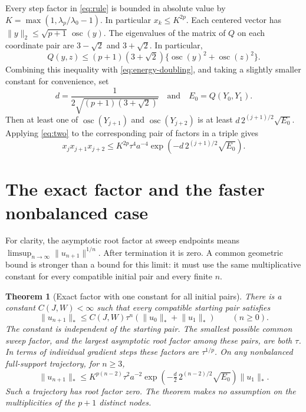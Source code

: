 \documentclass[11pt,a4paper]{article}
\newtheorem{theorem}{Theorem}
\numberwithin{equation}{section}
\DeclareMathOperator{\osc}{osc}
\newcommand{\norm}[1]{\lVert #1\rVert}
\begin{document}
Every step factor in \eqref{eq:rule} is bounded in absolute value by \(K=\max(1,\lambda_p/\lambda_0-1)\). In particular \(x_k\le K^{2p}\). Each centered vector has \(\norm y_2\le \sqrt{p+1}\,\osc(y)\). The eigenvalues of the matrix of \(Q\) on each coordinate pair
are \(3-\sqrt2\) and \(3+\sqrt2\). In particular,
\[
 Q(y,z)\le(p+1)(3+\sqrt2)
          \{\operatorname{osc}(y)^2+\operatorname{osc}(z)^2\}.
\]
Combining this inequality with \eqref{eq:energy-doubling}, and taking
a slightly smaller constant for convenience, set
\[
 d=\frac{1}{2\sqrt{(p+1)(3+\sqrt2)}}\quad\text{and}\quad E_0=Q(Y_0,Y_1).
\]
Then at least one of \(\osc(Y_{j+1})\) and \(\osc(Y_{j+2})\) is at least \(d\,2^{(j+1)/2}\sqrt{E_0}\). Applying \eqref{eq:two} to the corresponding pair of factors in a triple gives
\begin{equation}\label{eq:triple}
 x_jx_{j+1}x_{j+2}
 \le K^{2p}\tau^4a^{-4}\exp(-d\,2^{(j+1)/2}\sqrt{E_0}) .
\end{equation}

\section{The exact factor and the faster nonbalanced case}\label{sec:rate}
For clarity, the asymptotic root factor at sweep endpoints means
\(\limsup_{n\to\infty}\|u_{n+1}\|^{1/n}\). After termination it is
zero. A common geometric bound is stronger than a bound for this
limit: it must use the same multiplicative constant for every
compatible initial pair and every finite \(n\).

\begin{theorem}[Exact factor with one constant for all initial pairs]\label{thm:sharp}
There is a constant \(C(J,W)<\infty\) such that every compatible starting pair satisfies
\[
 \norm{u_{n+1}}_*\le C(J,W)\tau^n(\norm{u_0}_*+\norm{u_1}_*)\qquad(n\ge0).
\]
The constant is independent of the starting pair. The smallest
possible common sweep factor, and the largest asymptotic root factor
among these pairs, are both \(\tau\). In terms of individual gradient
steps these factors are \(\tau^{1/p}\). On any nonbalanced full-support trajectory, for \(n\ge3\),
\[
  \norm{u_{n+1}}_*
  \le K^{p(n-2)}\tau^2a^{-2}
       \exp\!\left(-\tfrac d2\,2^{(n-2)/2}\sqrt{E_0}\right)\norm{u_1}_* .
\]
Such a trajectory has root factor zero. The theorem makes no assumption on the multiplicities of the \(p+1\) distinct nodes.
\end{theorem}
\end{document}
